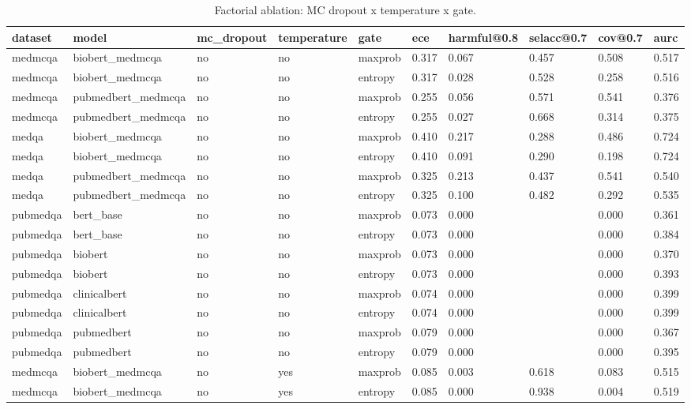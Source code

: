 \begin{table}[htbp]
\centering
\caption{Factorial ablation: MC dropout x temperature x gate.}
\label{tab:rev_factorial_ablation}
\begin{tabular}{llllllllll}
\toprule
dataset & model & mc\_dropout & temperature & gate & ece & harmful@0.8 & selacc@0.7 & cov@0.7 & aurc \\
\midrule
medmcqa & biobert\_medmcqa & no & no & maxprob & 0.317 & 0.067 & 0.457 & 0.508 & 0.517 \\
medmcqa & biobert\_medmcqa & no & no & entropy & 0.317 & 0.028 & 0.528 & 0.258 & 0.516 \\
medmcqa & pubmedbert\_medmcqa & no & no & maxprob & 0.255 & 0.056 & 0.571 & 0.541 & 0.376 \\
medmcqa & pubmedbert\_medmcqa & no & no & entropy & 0.255 & 0.027 & 0.668 & 0.314 & 0.375 \\
medqa & biobert\_medmcqa & no & no & maxprob & 0.410 & 0.217 & 0.288 & 0.486 & 0.724 \\
medqa & biobert\_medmcqa & no & no & entropy & 0.410 & 0.091 & 0.290 & 0.198 & 0.724 \\
medqa & pubmedbert\_medmcqa & no & no & maxprob & 0.325 & 0.213 & 0.437 & 0.541 & 0.540 \\
medqa & pubmedbert\_medmcqa & no & no & entropy & 0.325 & 0.100 & 0.482 & 0.292 & 0.535 \\
pubmedqa & bert\_base & no & no & maxprob & 0.073 & 0.000 &  & 0.000 & 0.361 \\
pubmedqa & bert\_base & no & no & entropy & 0.073 & 0.000 &  & 0.000 & 0.384 \\
pubmedqa & biobert & no & no & maxprob & 0.073 & 0.000 &  & 0.000 & 0.370 \\
pubmedqa & biobert & no & no & entropy & 0.073 & 0.000 &  & 0.000 & 0.393 \\
pubmedqa & clinicalbert & no & no & maxprob & 0.074 & 0.000 &  & 0.000 & 0.399 \\
pubmedqa & clinicalbert & no & no & entropy & 0.074 & 0.000 &  & 0.000 & 0.399 \\
pubmedqa & pubmedbert & no & no & maxprob & 0.079 & 0.000 &  & 0.000 & 0.367 \\
pubmedqa & pubmedbert & no & no & entropy & 0.079 & 0.000 &  & 0.000 & 0.395 \\
medmcqa & biobert\_medmcqa & no & yes & maxprob & 0.085 & 0.003 & 0.618 & 0.083 & 0.515 \\
medmcqa & biobert\_medmcqa & no & yes & entropy & 0.085 & 0.000 & 0.938 & 0.004 & 0.519 \\

\end{tabular}
\end{table}
